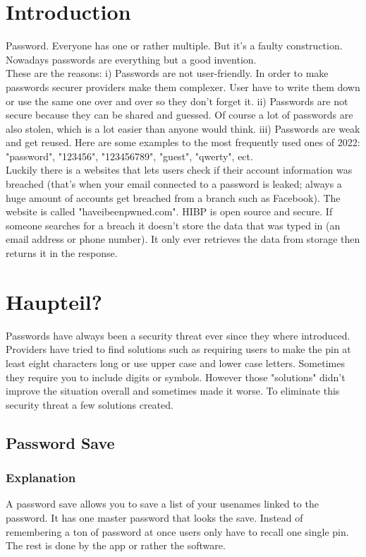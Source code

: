 \documentclass[10pt,a4paper,titlepage]{paper}
\begin{document}
\section{Introduction}
Password. Everyone has one or rather multiple. But it's a faulty construction. Nowadays passwords are everything but a good invention.\\ These are the reasons: i) Passwords are not user-friendly. In order to make passwords securer providers make them complexer. User have to write them down or use the same one over and over so they don't forget it. ii) Passwords are not secure because they can be shared and guessed. Of course a lot of passwords are also stolen, which is a lot easier than anyone would think. iii) Passwords are weak and get reused. Here are some examples to the most frequently used ones of 2022: "password", "123456", "123456789", "guest", "qwerty", ect.\\
Luckily there is a websites that lets users check if their account information was breached (that's when your email connected to a password is leaked; always a huge amount of accounts get breached from a branch such as Facebook). The website is called "haveibeenpwned.com". HIBP is open source and secure. If someone searches for a breach it doesn't store the data that was typed in (an email address or phone number). It only ever retrieves the data from storage then returns it in the response. 

\section{Haupteil?}
Passwords have always been a security threat ever since they where introduced. Providers have tried to find solutions such as requiring users to make the pin at least eight characters long or use upper case and lower case letters. Sometimes they require you to include digits or symbols. However those "solutions" didn't improve the situation overall and sometimes made it worse.
To eliminate this security threat a few solutions created.

\subsection{Password Save}
\subsubsection{Explanation}
A password save allows you to save a list of your usenames linked to the password. It has one master password that looks the save. Instead of remembering a ton of password at once users only have to recall one single pin. The rest is done by the app or rather the software.
\end{document}
